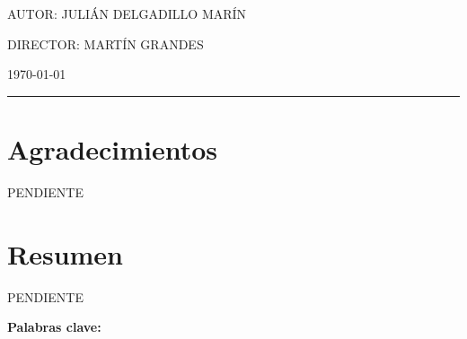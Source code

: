 \documentclass[12pt,a4paper]{report}
\newcommand{\thesisbodyformat}{%
	\onehalfspacing
	\justifying
	\setlength{\emergencystretch}{2em}
	\setlength{\parindent}{0pt}
	\setlength{\parskip}{0.8em}
}
\newcommand{\ShelfRule}{%
	\vspace{-0.15cm}
	\par\noindent
	\textcolor{lineblue}{\rule{\linewidth}{0.6pt}}%
}
\begin{document}
\begin{titlepage}
		\begin{center}
			\begin{minipage}{0.9\textwidth}
				\raggedright
				{\timesfont\fontsize{14}{17}\selectfont
					\MakeUppercase{Autor: Julián Delgadillo Marín}}

				\vspace{0.25cm}

				{\timesfont\fontsize{14}{17}\selectfont
					\MakeUppercase{Director: Martín Grandes}}
			\end{minipage}
		\end{center}

		\vfill

		\begin{center}
			{\cambriafont\fontsize{12}{14}\selectfont \MakeUppercase{\today}}
		\end{center}
		\ShelfRule

	\end{titlepage}

	\thesisbodyformat


	\chapter*{Agradecimientos}
	\label{chap:agradecimiento}
	PENDIENTE


	\chapter*{Resumen}
	\label{chap:resumen}
	PENDIENTE\par\medskip
	\noindent\textbf{Palabras clave:}
\end{document}
